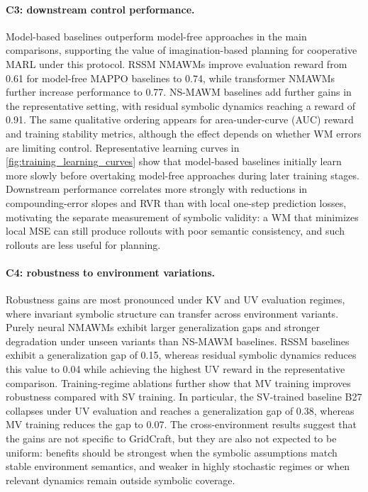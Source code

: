 \documentclass{article}
\theoremstyle{plain}
\theoremstyle{definition}
\theoremstyle{remark}
\begin{document}
\paragraph{C3: downstream control performance.}

Model-based baselines outperform model-free approaches in the main comparisons, supporting the value of imagination-based planning for cooperative MARL under this protocol. RSSM NMAWMs improve evaluation reward from 0.61 for model-free MAPPO baselines to 0.74, while transformer NMAWMs further increase performance to 0.77. NS-MAWM baselines add further gains in the representative setting, with residual symbolic dynamics reaching a reward of 0.91.
The same qualitative ordering appears for area-under-curve (AUC) reward and training stability metrics, although the effect depends on whether WM errors are limiting control. Representative learning curves in \autoref{fig:training_learning_curves} show that model-based baselines initially learn more slowly before overtaking model-free approaches during later training stages. Downstream performance correlates more strongly with reductions in compounding-error slopes and RVR than with local one-step prediction losses, motivating the separate measurement of symbolic validity: a WM that minimizes local MSE can still produce rollouts with poor semantic consistency, and such rollouts are less useful for planning.

\paragraph{C4: robustness to environment variations.}

Robustness gains are most pronounced under KV and UV evaluation regimes, where invariant symbolic structure can transfer across environment variants. Purely neural NMAWMs exhibit larger generalization gaps and stronger degradation under unseen variants than NS-MAWM baselines. RSSM baselines exhibit a generalization gap of 0.15, whereas residual symbolic dynamics reduces this value to 0.04 while achieving the highest UV reward in the representative comparison.
Training-regime ablations further show that MV training improves robustness compared with SV training. In particular, the SV-trained baseline B27 collapses under UV evaluation and reaches a generalization gap of 0.38, whereas MV training reduces the gap to 0.07. The cross-environment results suggest that the gains are not specific to GridCraft, but they are also not expected to be uniform: benefits should be strongest when the symbolic assumptions match stable environment semantics, and weaker in highly stochastic regimes or when relevant dynamics remain outside symbolic coverage.
\end{document}
